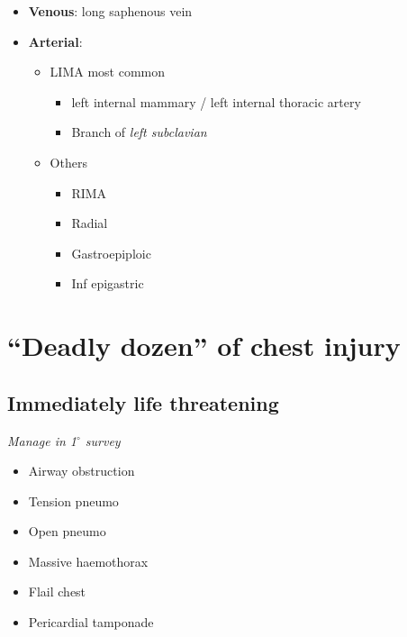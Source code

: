 \documentclass[
  12pt,
]{memoir}
\providecommand{\tightlist}{%
  \setlength{\itemsep}{0pt}\setlength{\parskip}{0pt}}
\begin{document}
\begin{itemize}
\tightlist
\item
  \textbf{Venous}: long saphenous vein \pagebreak
\item
  \textbf{Arterial}:

  \begin{itemize}
  \tightlist
  \item
    LIMA most common

    \begin{itemize}
    \tightlist
    \item
      left internal mammary / left internal thoracic artery
    \item
      Branch of \emph{left subclavian}
    \end{itemize}
  \item
    Others

    \begin{itemize}
    \tightlist
    \item
      RIMA
    \item
      Radial
    \item
      Gastroepiploic
    \item
      Inf epigastric
    \end{itemize}
  \end{itemize}
\end{itemize}

\hypertarget{deadly-dozen-of-chest-injury}{%
\section{``Deadly dozen'' of chest
injury}\label{deadly-dozen-of-chest-injury}}

\hypertarget{immediately-life-threatening}{%
\subsection{Immediately life
threatening}\label{immediately-life-threatening}}

\emph{Manage in 1\(^\circ\) survey}

\begin{itemize}
\tightlist
\item
  Airway obstruction
\item
  Tension pneumo
\item
  Open pneumo
\item
  Massive haemothorax
\item
  Flail chest
\item
  Pericardial tamponade
\end{itemize}
\end{document}
